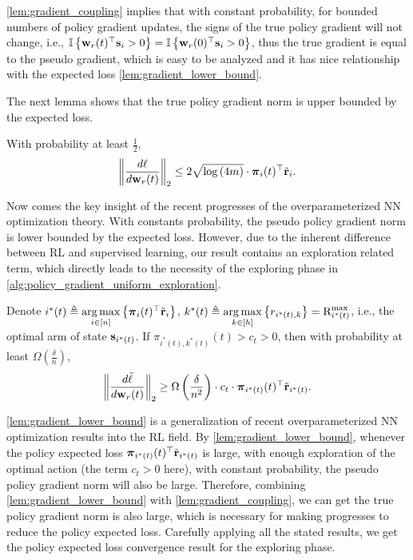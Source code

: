 \cref{lem:gradient_coupling} implies that with constant probability, for bounded numbers of policy gradient updates, the signs of the true policy gradient will not change, i.e., ${\mathbb{I}}\left\{ {\mathbf{w}}_r(t)^\top {\mathbf{s}}_i > 0 \right\} = {\mathbb{I}}\left\{ {\mathbf{w}}_r(0)^\top {\mathbf{s}}_i > 0 \right\}$, thus the true gradient is equal to the pseudo gradient, which is easy to be analyzed and it has nice relationship with the expected loss \cref{lem:gradient_lower_bound}.

The next lemma shows that the true policy gradient norm is upper bounded by the expected loss.

\begin{lem}
\label{lem:gradient_upper_bound}
With probability at least $\frac{1}{2}$,
\begin{equation*}
\begin{split}
	\left\| \frac{d\ell}{d {\mathbf{w}}_r(t)} \right\|_2 \le 2 \sqrt{\log{\left(4m\right)}} \cdot {\boldsymbol{\pi}}_{i}(t)^\top {\tilde{\mathbf{r}}}_i.
\end{split}
\end{equation*}
\end{lem}

Now comes the key insight of the recent progresses of the overparameterized NN optimization theory. With constants probability, the pseudo policy gradient norm is lower bounded by the expected loss. However, due to the inherent difference between RL and supervised learning, our result contains an exploration related term, which directly leads to the necessity of the exploring phase in \cref{alg:policy_gradient_uniform_exploration}. 

\begin{lem}
\label{lem:gradient_lower_bound}
	Denote $i^*(t) \triangleq \operatorname*{arg\,max}\limits_{i \in [n]}\left\{{\boldsymbol{\pi}}_i(t)^\top {\tilde{\mathbf{r}}}_i \right\}$, $k^*(t) \triangleq \operatorname*{arg\,max}\limits_{k \in [h]}\left\{ r_{i^*(t),k} \right\} = {\text{R}}_{i^*(t)}^{\max}$, i.e., the optimal arm of state ${\mathbf{s}}_{i^*(t)}$. If $\pi_{i^*(t), k^*(t)}(t) > c_t > 0$, then with probability at least $\Omega\left( \frac{\delta}{n} \right)$,
\begin{equation*}
\begin{split}
	\left\| \frac{d\tilde{\ell}}{d {\mathbf{w}}_r(t)} \right\|_2 \ge \Omega\left( \frac{\delta}{n^2} \right) \cdot c_t \cdot  {\boldsymbol{\pi}}_{i^*(t)}(t)^\top {\tilde{\mathbf{r}}}_{i^*(t)}.
\end{split}
\end{equation*}
\end{lem}

\cref{lem:gradient_lower_bound} is a generalization of recent overparameterized NN optimization results into the RL field. By \cref{lem:gradient_lower_bound}, whenever the policy expected loss ${\boldsymbol{\pi}}_{i^*(t)}(t)^\top {\tilde{\mathbf{r}}}_{i^*(t)}$ is large, with enough exploration of the optimal action (the term $c_t > 0$ here), with constant probability, the pseudo policy gradient norm will also be large. Therefore, combining \cref{lem:gradient_lower_bound} with \cref{lem:gradient_coupling}, we can get the true policy gradient norm is also large, which is necessary for making progresses to reduce the policy expected loss. Carefully applying all the stated results, we get the policy expected loss convergence result for the exploring phase.

